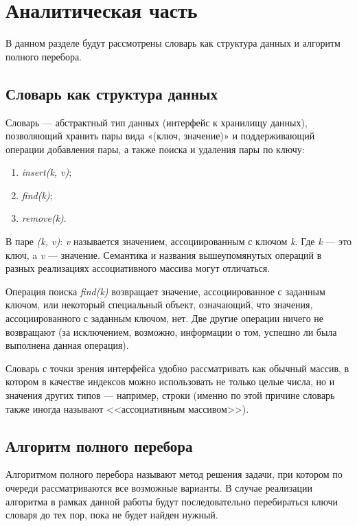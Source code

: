 \chapter{Аналитическая часть}
В данном разделе будут рассмотрены словарь как структура данных и алгоритм полного перебора.

\section{Словарь как структура данных}

Словарь --- абстрактный тип данных (интерфейс к хранилищу данных), позволяющий хранить пары вида «(ключ, значение)» и поддерживающий операции добавления пары, а также поиска и удаления пары по ключу:
\begin{enumerate}[label=\arabic*), itemindent=1em]
	\item \textit{insert(k, v)};
	\item \textit{find(k)};
	\item \textit{remove(k)}.
\end{enumerate}

В паре \textit{(k, v)}: \textit{v} называется значением, ассоциированным с ключом \textit{k}. Где \textit{k} — это ключ, a \textit{v} — значение. Семантика и названия вышеупомянутых операций в разных реализациях ассоциативного массива могут отличаться.

Операция поиска \textit{find(k)} возвращает значение, ассоциированное с заданным ключом, или некоторый специальный объект, означающий, что значения, ассоциированного с заданным ключом, нет. Две другие операции ничего не возвращают (за исключением, возможно, информации о том, успешно ли была выполнена данная операция).

Словарь с точки зрения интерфейса удобно рассматривать как обычный массив, в котором в качестве индексов можно использовать не только целые числа, но и значения других типов --- например, строки (именно по этой причине словарь также иногда называют <<ассоциативным массивом>>).

\section{Алгоритм полного перебора}
Алгоритмом полного перебора называют метод решения задачи, при котором по очереди рассматриваются все возможные варианты. В случае реализации алгоритма в рамках данной работы будут последовательно перебираться ключи словаря до тех пор, пока не будет найден нужный.

